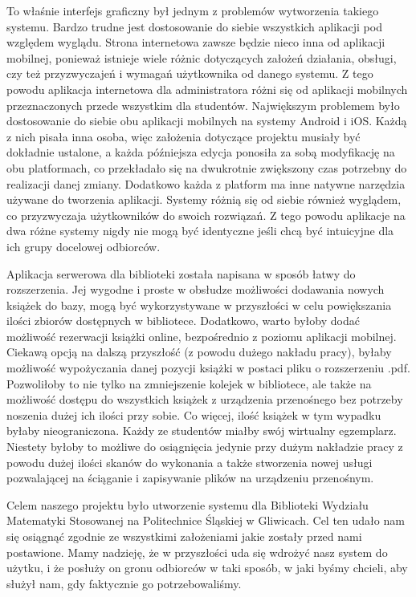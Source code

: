 \documentclass[twoside]{projektInzynierskiMS}
\begin{document}
To właśnie interfejs graficzny był jednym z problemów wytworzenia takiego systemu. Bardzo trudne jest dostosowanie do siebie wszystkich aplikacji pod względem wyglądu. Strona internetowa zawsze będzie nieco inna od aplikacji mobilnej, ponieważ istnieje wiele różnic dotyczących założeń działania, obsługi, czy też przyzwyczajeń i wymagań użytkownika od danego systemu. Z tego powodu aplikacja internetowa dla administratora różni się od aplikacji mobilnych przeznaczonych przede wszystkim dla studentów. Największym problemem było dostosowanie do siebie obu aplikacji mobilnych na systemy Android i iOS. Każdą z nich pisała inna osoba, więc założenia dotyczące projektu musiały być dokładnie ustalone, a każda późniejsza edycja ponosiła za sobą modyfikację na obu platformach, co przekładało się na dwukrotnie zwiększony czas potrzebny do realizacji danej zmiany. Dodatkowo każda z platform ma inne natywne narzędzia używane do tworzenia aplikacji. Systemy różnią się od siebie również wyglądem, co przyzwyczaja użytkowników do swoich rozwiązań. Z tego powodu aplikacje na dwa różne systemy nigdy nie mogą być identyczne jeśli chcą być intuicyjne dla ich grupy docelowej odbiorców.

Aplikacja serwerowa dla biblioteki została napisana w sposób łatwy do rozszerzenia. Jej wygodne i proste w obsłudze możliwości dodawania nowych książek do bazy, mogą być wykorzystywane w przyszłości w celu powiększania ilości zbiorów dostępnych w bibliotece. Dodatkowo, warto byłoby dodać możliwość rezerwacji książki online, bezpośrednio z poziomu aplikacji mobilnej. Ciekawą opcją na dalszą przyszłość (z powodu dużego nakładu pracy), byłaby możliwość wypożyczania danej pozycji książki w postaci pliku o rozszerzeniu .pdf. Pozwoliłoby to nie tylko na zmniejszenie kolejek w bibliotece, ale także na możliwość dostępu do wszystkich książek z urządzenia przenośnego bez potrzeby noszenia dużej ich ilości przy sobie. Co więcej, ilość książek w tym wypadku byłaby nieograniczona. Każdy ze studentów miałby swój wirtualny egzemplarz. Niestety byłoby to możliwe do osiągnięcia jedynie przy dużym nakładzie pracy z powodu dużej ilości skanów do wykonania a także stworzenia nowej usługi pozwalającej na ściąganie i zapisywanie plików na urządzeniu przenośnym.

Celem naszego projektu było utworzenie systemu dla Biblioteki Wydziału Matematyki Stosowanej na Politechnice Śląskiej w Gliwicach. Cel ten udało nam się osiągnąć zgodnie ze wszystkimi założeniami jakie zostały przed nami postawione. Mamy nadzieję, że w przyszłości uda się wdrożyć nasz system do użytku, i że posłuży on gronu odbiorców w taki sposób, w jaki byśmy chcieli, aby służył nam, gdy faktycznie go potrzebowaliśmy.
\end{document}
